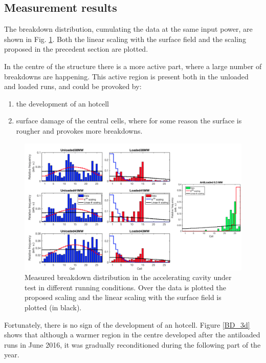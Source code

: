 \subsection[Measurement results]{Measurement results}

The breakdown distribution, cumulating the data at the same input power, are shown in Fig. \ref{BD_distro}. Both the linear scaling with the surface field and the scaling proposed in the precedent section are plotted.

In the centre of the structure there is a more active part, where a large number of breakdowns are happening. This active region is present both in the unloaded and loaded runs, and could be provoked by: 
\begin{enumerate}
\item the development of an hotcell
\item surface damage of the central cells, where for some reason the surface is rougher and provokes more breakdowns. 
\end{enumerate}

\begin{landscape}

\begin{figure}[p]
\centering 
\includegraphics[scale=0.53]{pictures/distro_all.png}
\caption{Measured breakdown distribution in the accelerating cavity under test in different running conditions. Over the data is plotted the proposed scaling and the linear scaling with the surface field is plotted (in black).}
\label{BD_distro}
\end{figure}
 
\end{landscape}



Fortunately, there is no sign of the development of an hotcell. Figure \ref{BD_3d} shows that although a warmer region in the centre developed after the antiloaded runs in June 2016, it was gradually reconditioned during the following part of the year. 

